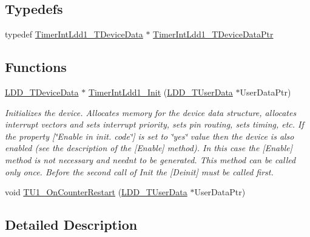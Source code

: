 \subsection*{Typedefs}
\begin{DoxyCompactItemize}
\item 
typedef \hyperlink{struct_timer_int_ldd1___t_device_data}{Timer\+Int\+Ldd1\+\_\+\+T\+Device\+Data} $\ast$ \hyperlink{group___timer_int_ldd1__module_ga24d5bad052ceefb0ed97378c80c8dc03}{Timer\+Int\+Ldd1\+\_\+\+T\+Device\+Data\+Ptr}
\end{DoxyCompactItemize}
\subsection*{Functions}
\begin{DoxyCompactItemize}
\item 
\hyperlink{group___p_e___types__module_gac5cf1362f1f0e3a2ce71b1bf2276d091}{L\+D\+D\+\_\+\+T\+Device\+Data} $\ast$ \hyperlink{group___timer_int_ldd1__module_ga069f7459fc74e21fb9bcceadbe7cb9cb}{Timer\+Int\+Ldd1\+\_\+\+Init} (\hyperlink{group___p_e___types__module_ga0b66a73f87238a782318aa0be7578e35}{L\+D\+D\+\_\+\+T\+User\+Data} $\ast$User\+Data\+Ptr)
\begin{DoxyCompactList}\small\item\em Initializes the device. Allocates memory for the device data structure, allocates interrupt vectors and sets interrupt priority, sets pin routing, sets timing, etc. If the property \mbox{[}\char`\"{}\+Enable in init. code\char`\"{}\mbox{]} is set to \char`\"{}yes\char`\"{} value then the device is also enabled (see the description of the \mbox{[}Enable\mbox{]} method). In this case the \mbox{[}Enable\mbox{]} method is not necessary and needn\textquotesingle{}t to be generated. This method can be called only once. Before the second call of Init the \mbox{[}Deinit\mbox{]} must be called first. \end{DoxyCompactList}\item 
void \hyperlink{group___timer_int_ldd1__module_ga915c714e97fd2a66385fddc37d45352a}{T\+U1\+\_\+\+On\+Counter\+Restart} (\hyperlink{group___p_e___types__module_ga0b66a73f87238a782318aa0be7578e35}{L\+D\+D\+\_\+\+T\+User\+Data} $\ast$User\+Data\+Ptr)
\end{DoxyCompactItemize}


\subsection{Detailed Description}



